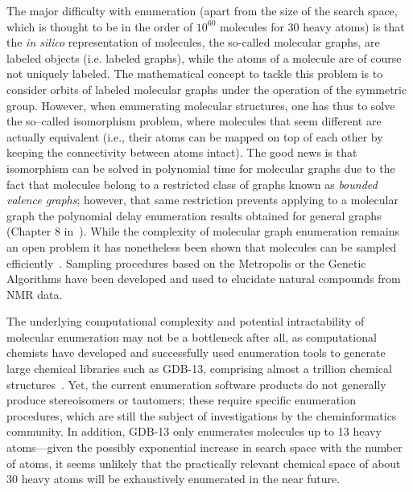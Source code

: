 \documentclass{sig-alternate}
\begin{document}
The major difficulty with enumeration (apart from the size of the search space, which is thought to be in the order of
$10^{60}$ molecules for 30 heavy atoms) is that the \emph{in silico}
representation of molecules, the so-called molecular graphs, are
labeled objects (i.e. labeled graphs), while the atoms of a molecule
are of course not uniquely labeled. The mathematical concept to tackle
this problem is to consider orbits of labeled molecular graphs under
the operation of the symmetric group. However, when enumerating molecular
structures, one has thus to solve the so--called isomorphism problem, where molecules that seem different are actually
equivalent (i.e., their atoms can be mapped on top of each other by keeping the connectivity between atoms intact).
The good news is that isomorphism can be solved in polynomial time for
molecular graphs due to the fact that molecules belong to a restricted
class of graphs known as \emph{bounded valence graphs}; however, that
same restriction prevents applying to a molecular graph the polynomial
delay enumeration results obtained for general graphs (Chapter 8 in~\cite{faulon2010}). While the complexity of molecular graph
enumeration remains an open problem it has nonetheless been shown that
molecules can be sampled efficiently~\cite{goldberg1999}. Sampling
procedures based on the Metropolis or the Genetic Algorithms have been
developed and used to elucidate natural compounds from NMR data.

The underlying computational complexity and potential intractability
of molecular enumeration may not be a bottleneck after all, as
computational chemists have developed and successfully used
enumeration tools to generate large chemical libraries such as GDB-13,
comprising almost a trillion chemical
structures~\cite{GDB}. Yet,
the current enumeration software products do not generally produce
stereoisomers or tautomers; these require specific enumeration
procedures, which are still the subject of investigations by the
cheminformatics community. In addition, GDB-13 only enumerates molecules up to 13 heavy atoms---given the possibly
exponential increase in search space with the number of atoms, it seems unlikely that the practically relevant chemical
space of about 30 heavy atoms will be exhaustively enumerated in the near future.
\end{document}
